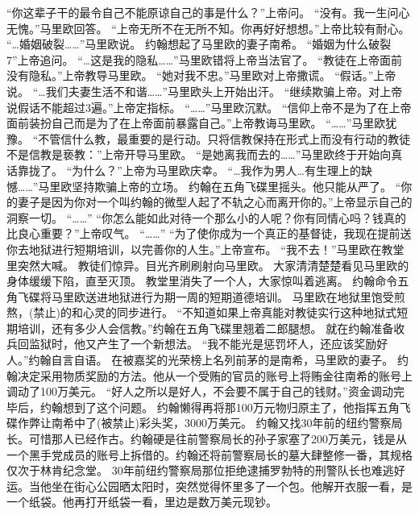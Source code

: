 \documentclass[a4paper,12pt,UTF8,twoside]{ctexbook}
\begin{document}
        “你这辈子干的最令自己不能原谅自己的事是什么？”上帝问。  
        “没有。我一生问心无愧。”马里欧回答。  
        “上帝无所不在无所不知。你再好好想想。”上帝比较有耐心。  
        “…婚姻破裂……”马里欧说。  
        约翰想起了马里欧的妻子南希。        
        “婚姻为什么破裂7”上帝追问。  
        “…这是我的隐私……”马里欧错将上帝当法官了。  
        “教徒在上帝面前没有隐私。”上帝教导马里欧。  
        “她对我不忠。”马里欧对上帝撒谎。  
        “假话。”上帝说。  
        “…我们夫妻生活不和谐……”马里欧头上开始出汗。  
        “继续欺骗上帝。对上帝说假话不能超过3遍。”上帝定指标。  
        “……”马里欧沉默。  
        “信仰上帝不是为了在上帝面前装扮自己而是为了在上帝面前暴露自己。”上帝教诲马里欧。  
        “……”马里欧犹豫。  
        “不管信什么教，最重要的是行动。只将信教保持在形式上而没有行动的教徒不是信教是亵教：”上帝开导马里欧。  
        “是她离我而去的……”马里欧终于开始向真话靠拢了。  
        “为什么？”上帝为马里欧庆幸。  
        “…我作为男人…有生理上的缺憾……”马里欧坚持欺骗上帝的立场。  
        约翰在五角飞碟里摇头。他只能从严了。  
        “你的妻子是因为你对一个叫约翰的微型人起了不轨之心而离开你的。”上帝显示自己的洞察一切。  
        “……”  
        “你怎么能如此对待一个那么小的人呢？你有同情心吗？钱真的比良心重要？”上帝叹气。  
        “……”  
        “为了使你成为一个真正的基督徒，我现在提前送你去地狱进行短期培训，以完善你的人生。”上帝宣布。  
        “我不去！”马里欧在教堂里突然大喊。  
        教徒们惊异。目光齐刷刷射向马里欧。  
        大家清清楚楚看见马里欧的身体缓缓下陷，直至灭顶。  
        教堂里消失了一个人，大家惊叫着逃离。  
        约翰命令五角飞碟将马里欧送进地狱进行为期一周的短期道德培训。  
        马里欧在地狱里饱受煎熬，(禁止)的和心灵的同步进行。  
        “不知道如果上帝真能对教徒实行这种地狱式短期培训，还有多少人会信教。”约翰在五角飞碟里翘着二郎腿想。  
        就在约翰准备收兵回监狱时，他又产生了一个新想法。  
        “我不能光是惩罚坏人，还应该奖励好人。”约翰自言自语。        
        在被嘉奖的光荣榜上名列前茅的是南希，马里欧的妻子。  
        约翰决定采用物质奖励的方法。他从一个受贿的官员的账号上将贿金往南希的账号上调动了100万美元。  
        “好人之所以是好人，不会要不属于自己的钱财。”资金调动完毕后，约翰想到了这个问题。  
        约翰懒得再将那100万元物归原主了，他指挥五角飞碟作弊让南希中了(被禁止)彩头奖，3000万美元。  
        约翰又找30年前的纽约警察局长。可惜那人已经作古。约翰硬是往前警察局长的孙子家塞了200万美元，钱是从一个黑手党成员的账号上拆借的。约翰还将前警察局长的墓大肆整修一番，其规格仅次于林肯纪念堂。  
        30年前纽约警察局那位拒绝逮捕罗勃特的刑警队长也难逃好运。当他坐在街心公园晒太阳时，突然觉得怀里多了一个包。他解开衣服一看，是一个纸袋。他再打开纸袋一看，里边是数万美元现钞。  
\end{document}
